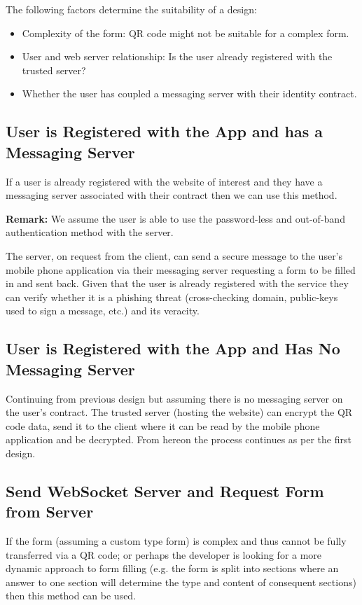 The following factors determine the suitability of a design:
\begin{itemize}
    \item Complexity of the form: QR code might not be suitable for a complex form.
    \item User and web server relationship: Is the user already registered with the trusted server?
    \item Whether the user has coupled a messaging server with their identity contract.
\end{itemize}

\subsection{User is Registered with the App and has a Messaging Server}
\label{sec::chp6::des1}

If a user is already registered with the website of interest and they have a messaging server associated with their \deeid contract then we can use this method.

\textbf{Remark:} We assume the user is able to use the password-less and out-of-band authentication method with the server.

The server, on request from the client, can send a secure message to the user's mobile phone application via their messaging server requesting a form to be filled in and sent back. Given that the user is already registered with the service they can verify whether it is a phishing threat (cross-checking domain, public-keys used to sign a message, etc.) and its veracity.

\subsection{User is Registered with the App and Has No Messaging Server}
\label{subsec:des2}
Continuing from previous design but assuming there is no messaging server on the user's \deeid contract. The trusted server (hosting the website) can encrypt the QR code data, send it to the client where it can be read by the \deeid mobile phone application and be decrypted. From hereon the process continues as per the first design.

\subsection{Send WebSocket Server and Request Form from Server}
\label{subsec:des3}
If the form (assuming a custom type form) is complex and thus cannot be fully transferred via a QR code; or perhaps the developer is looking for a more dynamic approach to form filling (e.g. the form is split into sections where an answer to one section will determine the type and content of consequent sections) then this method can be used.

